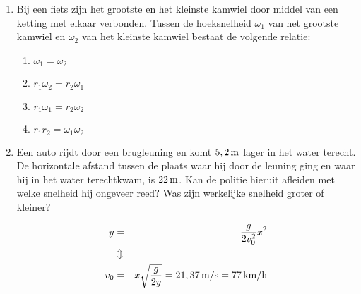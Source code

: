 \documentclass{ximera}
\begin{document}
\begin{enumerate}
\item Bij een fiets zijn het grootste en het kleinste kamwiel door
middel van een ketting met elkaar verbonden. Tussen de hoeksnelheid
$\omega_1$ van het grootste kamwiel en $\omega_2$ van het kleinste
kamwiel bestaat de volgende relatie:
\begin{minipage}[t]{0.4\textwidth}
\begin{enumerate}
\item $\omega_1=\omega_2$
\item $r_1\omega_2=r_2\omega_1$
\item $r_1\omega_1=r_2\omega_2$
\item $r_1r_2=\omega_1\omega_2$
\end{enumerate}
\end{minipage}
\begin{minipage}[t]{0.5\textwidth}
\end{minipage}



\item Een auto rijdt door een brugleuning en komt $5,2\rm\,m$ lager in het water terecht. De horizontale afstand tussen de plaats waar hij door de leuning ging en waar hij in het water terechtkwam, is $22\rm\,m$. Kan de politie hieruit afleiden met welke snelheid hij ongeveer reed? Was zijn werkelijke snelheid groter of kleiner?
\begin{oplossing}
\begin{eqnarray*}
y&=&\frac{g}{2v_0^2}x^2\\
&\Updownarrow&\\
v_0&=&x\sqrt{\frac{g}{2y}}=21,37\rm\,m/s=77\rm\,km/h
\end{eqnarray*}
\end{oplossing}




\end{enumerate}
\end{document}
